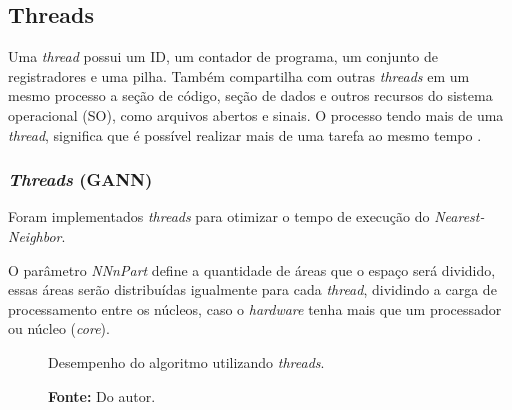 \documentclass[12pt,openright,a4paper,oneside]{tcc}
\begin{document}
		\subsection{Threads}

		Uma \textit{thread} possui um ID, um contador de programa, um conjunto de registradores e uma pilha. Também compartilha com outras \textit{threads} em um mesmo processo a seção de código, seção de dados e outros recursos do sistema operacional (SO), como arquivos abertos e sinais. 
		O processo tendo mais de uma \textit{thread}, significa que é possível realizar mais de uma tarefa ao mesmo tempo \cite{THREAD}.

			\subsubsection{\textit{Threads} (GANN)}

			Foram implementados \textit{threads} para otimizar o tempo de execução do \textit{Nearest-Neighbor}. 

			O parâmetro \textit{NNnPart} define a quantidade de áreas que o espaço será dividido, essas áreas serão distribuídas igualmente para cada \textit{thread}, dividindo a carga de processamento entre os núcleos, caso o \textit{hardware} tenha mais que um processador ou núcleo (\textit{core}).

			\begin{figure}[h!]
				\centering
                \caption{Desempenho do algoritmo utilizando \textit{threads}.}
				\caption*{\textbf{Fonte:} Do autor.}
				\label{figthread}
			\end{figure}
\end{document}
